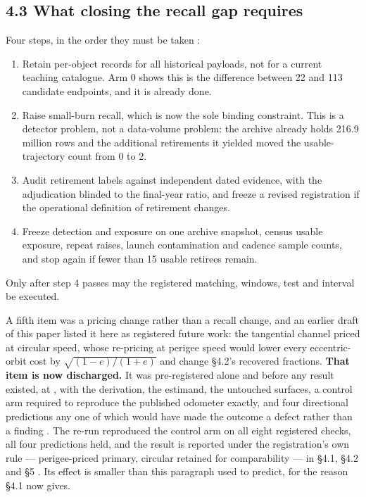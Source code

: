 \documentclass[11pt]{article}
\begin{document}
\subsection*{4.3 What closing the recall gap requires}

Four steps, in the order they must be taken%
:

\begin{enumerate}
\item[1.] Retain per-object records for all historical payloads, not for a current teaching catalogue. Arm 0 shows this is the difference between 22 and 113 candidate endpoints, and it is already done.
\item[2.] Raise small-burn recall, which is now the sole binding constraint. This is a detector problem, not a data-volume problem: the archive already holds 216.9 million rows and the additional retirements it yielded moved the usable-trajectory count from 0 to 2.
\item[3.] Audit retirement labels against independent dated evidence, with the adjudication blinded to the final-year ratio, and freeze a revised registration if the operational definition of retirement changes.
\item[4.] Freeze detection and exposure on one archive snapshot, census usable exposure, repeat raises, launch contamination and cadence sample counts, and stop again if fewer than 15 usable retirees remain.
\end{enumerate}

Only after step 4 passes may the registered matching, windows, test and interval be executed.

A fifth item was a pricing change rather than a recall change, and an earlier draft of this paper listed it here as registered future work: the tangential channel priced at circular speed, whose re-pricing at perigee speed would lower every eccentric-orbit cost by $\sqrt{(1-e)/(1+e)}$ and change \S{}4.2's recovered fractions. \textbf{That item is now discharged.} It was pre-registered alone and before any result existed, at , with the derivation, the estimand, the untouched surfaces, a control arm required to reproduce the published odometer exactly, and four directional predictions any one of which would have made the outcome a defect rather than a finding%
. The re-run reproduced the control arm on all eight registered checks, all four predictions held, and the result is reported under the registration's own rule --- perigee-priced primary, circular retained for comparability --- in \S{}4.1, \S{}4.2 and \S{}5%
. Its effect is smaller than this paragraph used to predict, for the reason \S{}4.1 now gives.
\end{document}
